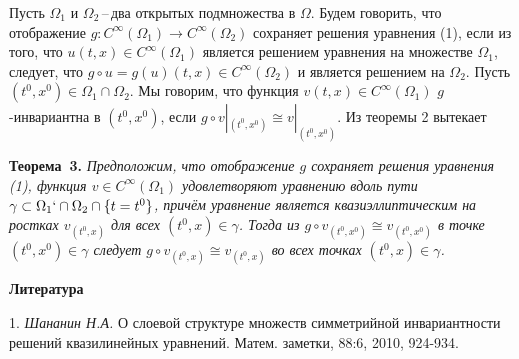 Пусть $\Omega_1$ и $\Omega_2$\,--\,два открытых подмножества в $\Omega$.
Будем говорить, что отображение
$g:C^{\infty}(\Omega_1)\to C^{\infty}(\Omega_2)$
сохраняет решения уравнения (1),
если из того, что $u(t,x)\in C^{\infty}(\Omega_1)$ является решением уравнения
на множестве $\Omega_1$, следует, что $g\circ u=g(u)(t,x)\in C^{\infty}(\Omega_2)$
и является решением на $\Omega_2$. Пусть $(t^0,x^0)\in \Omega_1\cap\Omega_2$.
Мы говорим, что функция $v(t,x)\in C^{\infty}(\Omega_1)$ $g$-инвариантна в $(t^0,x^0)$, если $g\circ v|_{(t^0,x^0)}\cong v|_{(t^0,x^0)}$. Из теоремы 2
вытекает

\textbf{Теорема~3.} {\it 
Предположим, что отображение $g$ сохраняет решения уравнения {\rm (1)},
функция $v\in C^{\infty}(\Omega_1)$ удовлетворяют уравнению вдоль пути $\gamma\subset\Omega_1`\cap\Omega_2\cap\{t=t^0\}$, причём уравнение
является квазиэллиптическим на ростках $v_{(t^0,x)}$ для всех $(t^0,x)\in\gamma$. Тогда из $g\circ v_{(t^0,x^0)}\cong v_{(t^0,x^0)}$ в точке
$(t^0,x^0)\in\gamma$ следует $g\circ v_{(t^0,x)}\cong v_{(t^0,x)}$ во всех точках
$(t^0,x)\in\gamma$.
}




\smallskip \centerline {\bf Литература} \nopagebreak

1. {\it Шананин Н.А.} О слоевой структуре множеств симметрийной инвариантности решений квазилинейных уравнений. Матем. заметки, 88:6, 2010, 924-934.
